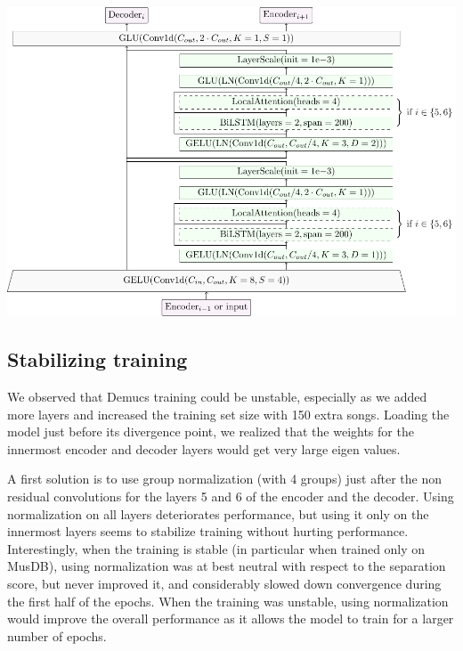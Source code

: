 \documentclass[10pt,a4paper,onecolumn]{article}
\let\origfigure\figure
\let\endorigfigure\endfigure
\renewenvironment{figure}[1][2] {
    \expandafter\origfigure\expandafter[H]
} {
    \endorigfigure
}
\begin{document}
\begin{figure}
\hypertarget{fig:residual}{%
\centering
\includegraphics{figures/residual.pdf}
\caption{Representation of the compressed residual branches that are
added to each encoder layer. For the 5th and 6th layer, a BiLSTM and a
local attention layer are added.}\label{fig:residual}
}
\end{figure}

\hypertarget{stabilizing-training}{%
\subsection{Stabilizing training}\label{stabilizing-training}}

We observed that Demucs training could be unstable, especially as we
added more layers and increased the training set size with 150 extra
songs. Loading the model just before its divergence point, we realized
that the weights for the innermost encoder and decoder layers would get
very large eigen values.

A first solution is to use group normalization (with 4 groups) just
after the non residual convolutions for the layers 5 and 6 of the
encoder and the decoder. Using normalization on all layers deteriorates
performance, but using it only on the innermost layers seems to
stabilize training without hurting performance. Interestingly, when the
training is stable (in particular when trained only on MusDB), using
normalization was at best neutral with respect to the separation score,
but never improved it, and considerably slowed down convergence during
the first half of the epochs. When the training was unstable, using
normalization would improve the overall performance as it allows the
model to train for a larger number of epochs.
\end{document}
